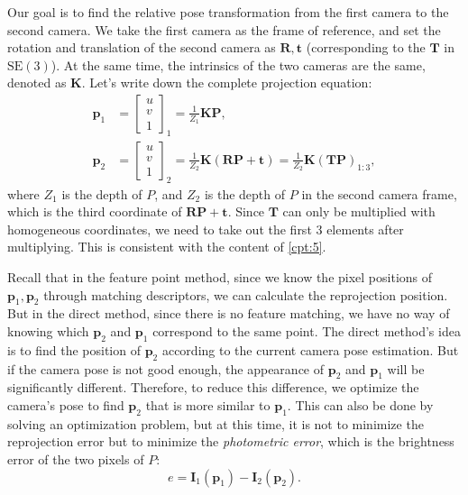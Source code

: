 Our goal is to find the relative pose transformation from the first camera to the second camera. We take the first camera as the frame of reference, and set the rotation and translation of the second camera as $\mathbf{R}, \mathbf{t}$ (corresponding to the $\mathbf{T}$ in $\mathrm{SE}(3)$). At the same time, the intrinsics of the two cameras are the same, denoted as $\mathbf{K}$. Let's write down the complete projection equation:
\begin{align*}
{\mathbf{p}_1} &= {\left[ \begin{array}{l}
	u\\
	v\\
	1
	\end{array} \right]_1} = \frac{1}{Z_1} \mathbf{KP}, \\
{\mathbf{p}_2} &= {\left[ \begin{array}{l}
	u\\
	v\\
	1
	\end{array} \right]_2} = \frac{1}{Z_2} \mathbf{K}\left( {\mathbf{RP} +\mathbf{t}} \right) = \frac{1}{Z_2} \mathbf{K} \left(\mathbf{T}  \mathbf{P} \right)_{1:3},
\end{align*}
where $Z_1$ is the depth of $P$, and $Z_2$ is the depth of $P$ in the second camera frame, which is the third coordinate of $\mathbf{RP}+\mathbf{t}$. Since $\mathbf{T}$ can only be multiplied with homogeneous coordinates, we need to take out the first 3 elements after multiplying. This is consistent with the content of \ref{cpt:5}.

Recall that in the feature point method, since we know the pixel positions of $\mathbf{p}_1, \mathbf{p}_2$ through matching descriptors, we can calculate the reprojection position. But in the direct method, since there is no feature matching, we have no way of knowing which $\mathbf{p}_2$ and $\mathbf{p}_1$ correspond to the same point. The direct method's idea is to find the position of $\mathbf{p}_2$ according to the current camera pose estimation. But if the camera pose is not good enough, the appearance of $\mathbf{p}_2$ and $\mathbf{p}_1$ will be significantly different. Therefore, to reduce this difference, we optimize the camera's pose to find $\mathbf{p}_2$ that is more similar to $\mathbf{p}_1$. This can also be done by solving an optimization problem, but at this time, it is not to minimize the reprojection error but to minimize the \textit{photometric error}, which is the brightness error of the two pixels of $P$:
\begin{equation}
e = {\mathbf{I}_1}\left( {{\mathbf{p}_1}} \right) - {\mathbf{I}_2}\left( {{\mathbf{p}_2}} \right).
\end{equation}

